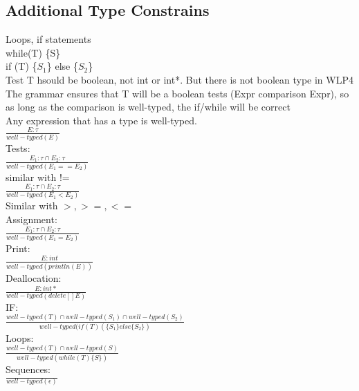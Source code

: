\documentclass[12pt]{article}
\begin{document}
	\subsection*{Additional Type Constrains}
	Loops, if statements\\
	while(T) \{S\}\\
	if (T) \{$S_1$\} else \{$S_2$\}\\
	
	Test T hsould be boolean, not int or int*. But there is not boolean type in WLP4\\
	The grammar ensures that T will be a boolean tests (Expr comparison Expr), so as long as the comparison is well-typed, the if/while will be correct\\
	
	Any expression that has a type is well-typed.\\
	$\frac{E: \tau}{well-typed(E)}$\\
	
	Tests:\\
	$\frac{E_1: \tau \cap E_2 : \tau}{well-typed(E_1==E_2)}$\\
	similar with !=\\
	
	$\frac{E_1: \tau \cap E_2: \tau}{well-typed(E_1<E_2)}$\\
	Similar with $>,>=,<=$\\
	
	Assignment:\\
	$\frac{E_1: \tau \cap E_2: \tau}{well-typed(E_1 = E_2)}$\\
	
	Print:\\
	$\frac{E: int}{well-typed(println(E))}$\\
	
	Deallocation:\\
	$\frac{E: int*}{well-typed(delete[] E)}$\\
	
	IF:\\
	$\frac{well-typed(T) \cap well-typed(S_1) \cap well-typed(S_2)}{well-typed(if(T)(\{S_1\} else \{S_2\})}$\\
	
	Loops:\\
	$\frac{well-typed(T) \cap well-typed(S)}{well-typed(while(T)\{S\})}$\\
	
	Sequences:\\
	$\frac{}{well-typed(\epsilon)}$\\
	
\end{document}
